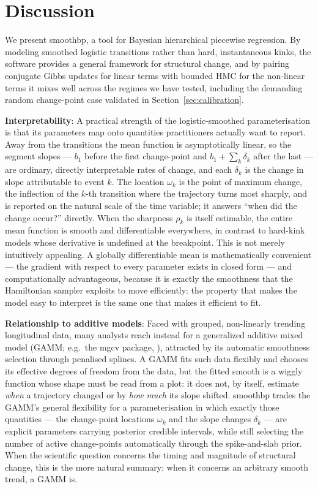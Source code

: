 \documentclass[12pt]{article}
\newcommand{\pkg}[1]{\textsf{#1}}
\begin{document}
\section{Discussion}

We present \pkg{smoothbp}, a tool for Bayesian hierarchical piecewise regression. By modeling smoothed logistic transitions rather than hard, instantaneous kinks, the software provides a general framework for structural change, and by pairing conjugate Gibbs updates for linear terms with bounded HMC for the non-linear terms it mixes well across the regimes we have tested, including the demanding random change-point case validated in Section~\ref{sec:calibration}.

\textbf{Interpretability}: A practical strength of the logistic-smoothed parameterisation is that its parameters map onto quantities practitioners actually want to report. Away from the transitions the mean function is asymptotically linear, so the segment slopes --- $b_1$ before the first change-point and $b_1 + \sum_k \delta_k$ after the last --- are ordinary, directly interpretable rates of change, and each $\delta_k$ is the change in slope attributable to event $k$. The location $\omega_k$ is the point of maximum change, the inflection of the $k$-th transition where the trajectory turns most sharply, and is reported on the natural scale of the time variable; it answers ``when did the change occur?'' directly. When the sharpness $\rho_k$ is itself estimable, the entire mean function is smooth and differentiable everywhere, in contrast to hard-kink models whose derivative is undefined at the breakpoint. This is not merely intuitively appealing. A globally differentiable mean is mathematically convenient --- the gradient with respect to every parameter exists in closed form --- and computationally advantageous, because it is exactly the smoothness that the Hamiltonian sampler exploits to move efficiently: the property that makes the model easy to interpret is the same one that makes it efficient to fit.

\textbf{Relationship to additive models}: Faced with grouped, non-linearly trending longitudinal data, many analysts reach instead for a generalized additive mixed model (GAMM; e.g.\ the \pkg{mgcv} package, \citealp{wood2017}), attracted by its automatic smoothness selection through penalised splines. A GAMM fits such data flexibly and chooses its effective degrees of freedom from the data, but the fitted smooth is a wiggly function whose shape must be read from a plot: it does not, by itself, estimate \emph{when} a trajectory changed or by \emph{how much} its slope shifted. \pkg{smoothbp} trades the GAMM's general flexibility for a parameterisation in which exactly those quantities --- the change-point locations $\omega_k$ and the slope changes $\delta_k$ --- are explicit parameters carrying posterior credible intervals, while still selecting the number of active change-points automatically through the spike-and-slab prior. When the scientific question concerns the timing and magnitude of structural change, this is the more natural summary; when it concerns an arbitrary smooth trend, a GAMM is.
\end{document}
